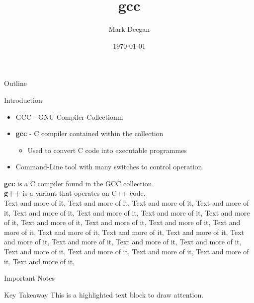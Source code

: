 \documentclass{beamer}
\title{\textbf{gcc}}
\author{Mark Deegan}
\institute{TU Dublin}
\date{\today}
\begin{document}
\begin{frame}
    \maketitle
\end{frame}

\begin{frame}{Outline}
    \tableofcontents
\end{frame}

\begin{frame}[allowframebreaks]{Introduction}
    \begin{itemize}
        \item GCC - GNU Compiler Collectionm
        \item \textbf{gcc} - C compiler contained within the collection
        \begin{itemize}
            \item Used to convert C code into executable programmes
        \end{itemize}
        \item Command-Line tool with many switches to control operation
    \end{itemize}
    \textbf{gcc} is a C compiler found in the GCC collection.
    \\
    \textbf{g++} is a variant that operates on C++ code.
    \\
    \framebreak
    Text and more of it, Text and more of it, Text and more of it, Text and more of it, Text and more of it, Text and more of it, Text and more of it, Text and more of it, Text and more of it, Text and more of it, Text and more of it, Text and more of it, Text and more of it, \framebreak
    Text and more of it, Text and more of it, Text and more of it, Text and more of it, Text and more of it, Text and more of it, Text and more of it, Text and more of it, Text and more of it, Text and more of it, Text and more of it, 
\end{frame}


\begin{frame}{Important Notes}
    \begin{block}{Key Takeaway}
        This is a highlighted text block to draw attention.
    \end{block}
\end{frame}
\end{document}
